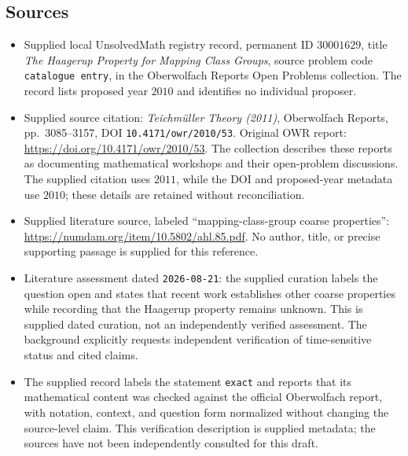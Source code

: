 \documentclass[11pt]{article}
\begin{document}
\subsection{Sources}
\begin{itemize}
\item Supplied local UnsolvedMath registry record, permanent ID \(30001629\), title \emph{The Haagerup Property for Mapping Class Groups}, source problem code \texttt{catalogue entry}, in the Oberwolfach Reports Open Problems collection. The record lists proposed year \(2010\) and identifies no individual proposer.
\item Supplied source citation: \emph{Teichmüller Theory (2011)}, Oberwolfach Reports, pp.~3085--3157, DOI \texttt{10.4171/owr/2010/53}. Original OWR report: \url{https://doi.org/10.4171/owr/2010/53}. The collection describes these reports as documenting mathematical workshops and their open-problem discussions. The supplied citation uses \(2011\), while the DOI and proposed-year metadata use \(2010\); these details are retained without reconciliation.
\item Supplied literature source, labeled ``mapping-class-group coarse properties'': \url{https://numdam.org/item/10.5802/ahl.85.pdf}. No author, title, or precise supporting passage is supplied for this reference.
\item Literature assessment dated \texttt{2026-08-21}: the supplied curation labels the question open and states that recent work establishes other coarse properties while recording that the Haagerup property remains unknown. This is supplied dated curation, not an independently verified assessment. The background explicitly requests independent verification of time-sensitive status and cited claims.
\item The supplied record labels the statement \texttt{exact} and reports that its mathematical content was checked against the official Oberwolfach report, with notation, context, and question form normalized without changing the source-level claim. This verification description is supplied metadata; the sources have not been independently consulted for this draft.
\end{itemize}
\end{document}
